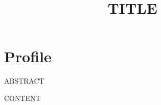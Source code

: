\documentclass[11pt,a4paper,sans]{moderncv}
\title{{{TITLE}}}
\begin{document}
\makecvtitle

\section{Profile}
{{ABSTRACT}}

{{CONTENT}}
\end{document}
